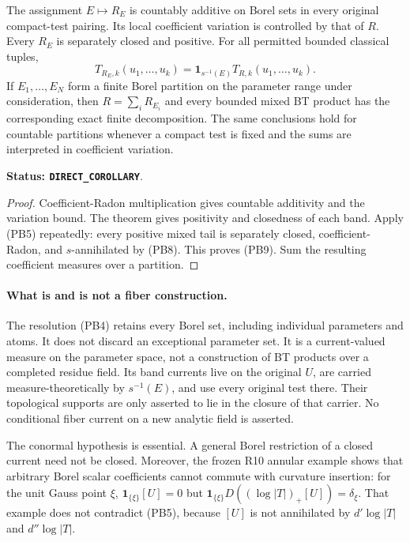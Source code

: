 \begin{corollary}
\label{cor:r12-current-valued-parameter-resolution}
The assignment $E\mapsto R_E$ is countably additive on Borel sets
in every original compact-test pairing. Its local coefficient
variation is controlled by that of $R$. Every $R_E$ is separately
closed and positive. For all permitted bounded classical tuples,
\[
 T_{R_E,k}(u_1,\ldots,u_k)
       =\mathbf1_{s^{-1}(E)}T_{R,k}(u_1,\ldots,u_k).
 \tag{PB9}
\]
If $E_1,\ldots,E_N$ form a finite Borel partition on the parameter
range under consideration, then $R=\sum_iR_{E_i}$ and every bounded
mixed BT product has the corresponding exact finite decomposition.
The same conclusions hold for countable partitions whenever a
compact test is fixed and the sums are interpreted in coefficient
variation.
\end{corollary}

\noindent\textbf{Status: \texttt{DIRECT\_COROLLARY}}.

\begin{proof}
Coefficient-Radon multiplication gives countable additivity and the
variation bound. The theorem gives positivity and closedness of each
band. Apply (PB5) repeatedly: every positive mixed tail is separately
closed, coefficient-Radon, and $s$-annihilated by (PB8). This proves
(PB9). Sum the resulting coefficient measures over a partition.
\end{proof}

\paragraph{What is and is not a fiber construction.}
The resolution (PB4) retains every Borel set, including individual
parameters and atoms. It does not discard an exceptional parameter
set. It is a current-valued measure on the parameter space, not a
construction of BT products over a completed residue field. Its band
currents live on the original $U$, are carried measure-theoretically
by $s^{-1}(E)$, and use every original test there. Their topological
supports are only asserted to lie in the closure of that carrier.
No conditional fiber current on a new analytic field is asserted.

The conormal hypothesis is essential. A general Borel restriction
of a closed current need not be closed. Moreover, the frozen R10
annular example shows that arbitrary Borel scalar coefficients
cannot commute with curvature insertion: for the unit Gauss point
$\xi$, $\mathbf1_{\{\xi\}}[U]=0$ but
$\mathbf1_{\{\xi\}}D((\log|T|)_+[U])=\delta_\xi$.
That example does not contradict (PB5), because $[U]$ is not
annihilated by $d'\log|T|$ and $d''\log|T|$.

